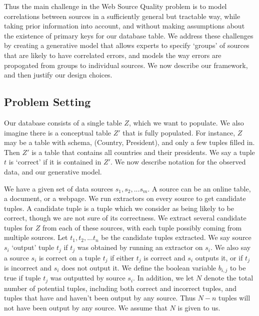 \documentclass{sig-alternate}
\newcounter{prob}
\begin{document}
Thus the main challenge in the Web Source Quality problem is to model correlations between sources in a sufficiently general but tractable way, while taking prior information into account, and without making assumptions about the existence of primary keys for our database table. We address these challenges by creating a generative model that allows experts to specify `groups' of sources that are likely to have correlated errors, and models the way errors are propogated from groups to individual sources. We now describe our framework, and then justify our design choices. 

\subsection{Problem Setting}\label{sec:formal}
Our database consists of a single table $Z$, which we want to populate. We also imagine there is a conceptual table $Z'$ that is fully populated. For instance, $Z$ may be a table with schema, (Country, President), and only a few tuples filled in. Then $Z'$ is a table that contains all countries and their presidents. We say a tuple $t$ is `correct' if it is contained in $Z'$. We now describe notation for the observed data, and our generative model.

We have a given set of data sources $s_1, s_2, ... s_m$. A source can be an online table, a document, or a webpage. We run extractors on every source to get candidate tuples. A candidate tuple is a tuple which we consider as being likely to be correct, though we are not sure of its correctness. We extract several candidate tuples for $Z$ from each of these sources, with each tuple possibly coming from multiple sources. Let $t_1, t_2, ... t_n$ be the candidate tuples extracted. We say source $s_i$ `output' tuple $t_j$ if $t_j$ was obtained by running an extractor on $s_i$. We also say a source $s_i$ is correct on a tuple $t_j$ if either $t_j$ is correct and $s_i$ outputs it, or if $t_j$ is incorrect and $s_i$ does not output it. We define the boolean variable $b_{i,j}$ to be true if tuple $t_j$ was outputted by source $s_i$. In addition, we let $N$ denote the total number of potential tuples, including both correct and incorrect tuples, and tuples that have and haven't been output by any source. Thus $N-n$ tuples will not have been output by any source. We assume that $N$ is given to us.
\end{document}
